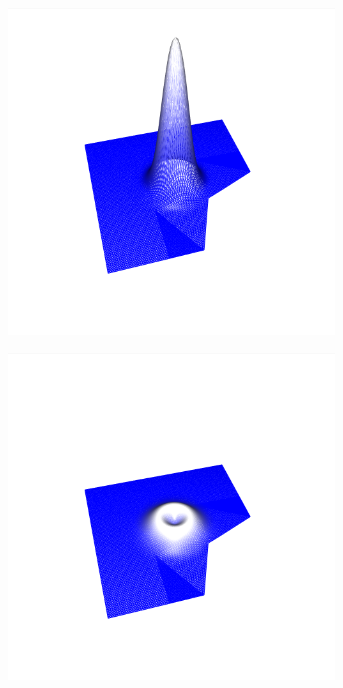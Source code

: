\documentclass[crop=false,10pt,ngerman]{standalone}
\begin{document}
      \begin{figure}[p]
        \center
        \begin{subfigure}[b]{0.24\textwidth}
          \center
          \includegraphics[trim={4cm 1.2cm 4.5cm 1.5cm},clip,width=0.95\textwidth]{images/test_wave_0.png}
          \caption{}
        \end{subfigure}
        \begin{subfigure}[b]{0.24\textwidth}
          \center
          \includegraphics[trim={4cm 1.2cm 4.5cm 1.5cm},clip,width=0.95\textwidth]{images/test_wave_1.png}

\end{subfigure}
\end{figure}
\end{document}
